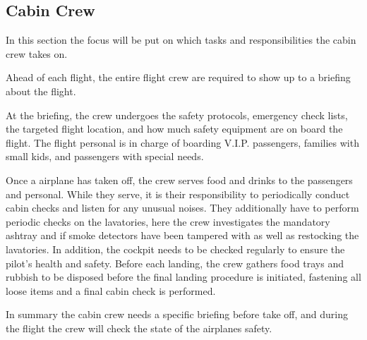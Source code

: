 \subsection{Cabin Crew}
In this section the focus will be put on which tasks and responsibilities the cabin crew takes on. 

Ahead of each flight, the entire flight crew are required to show up to a briefing about the flight.

At the briefing, the crew undergoes the safety protocols, emergency check lists, the targeted flight location, and how much safety equipment are on board the flight. The flight personal is in charge of boarding V.I.P. passengers, families with small kids, and passengers with special needs.

Once a airplane has taken off, the crew serves food and drinks to the passengers and personal. While they serve, it is their responsibility to periodically conduct cabin checks and listen for any unusual noises. They additionally have to perform periodic checks on the lavatories, here the crew investigates the mandatory ashtray and if smoke detectors have been tampered with as well as restocking the lavatories. In addition, the cockpit needs to be checked regularly to ensure the pilot's health and safety. Before each landing, the crew gathers food trays and rubbish to be disposed before the final landing procedure is initiated, fastening all loose items and a final cabin check is performed. 


In summary the cabin crew needs a specific briefing before take off, and during the flight the crew will check the state of the airplanes safety.